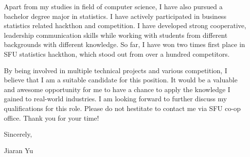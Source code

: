 {Apart from my studies in field of computer science, I have also pursued a bachelor degree major in statistics. I have actively participated in business statistics related hackthon and competition. I have developed strong cooperative, leadership communication skills while working with students from different backgrounds with different knowledge. So far, I have won two times first place in SFU statistics hackthon, which stood out from over a hundred competitors.

\vspace{5mm} 
\newline

By being involved in multiple technical projects and various competition, I believe that I am a suitable candidate for this position. It would be a valuable and awesome opportunity for me to have a chance to apply the knowledge I gained to real-world industries. I am looking forward to further discuss my qualifications for this role. Please do not hestitate to contact me via SFU co-op office. Thank you for your time!

\vspace{5mm} 
\newline
Sincerely,

\vspace{5mm} 


\vspace{5mm} 
\newline

Jiaran Yu


}
